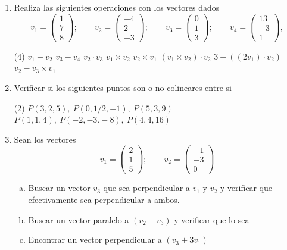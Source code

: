 \documentclass[12pt]{article}
\newenvironment{preguntas}
{\begin{enumerate}\itemsep12pt
	}
	{
	\end{enumerate}
}
\begin{document}
\begin{preguntas}
\item Realiza las siguientes operaciones con los vectores dados
	$$
	v_1 = \begin{pmatrix}
	1\\
	7\\
	8
\end{pmatrix};\qquad
	v_2 = \begin{pmatrix}
	-4\\
	2\\
	-3
\end{pmatrix}; \qquad
	v_3 = \begin{pmatrix}
	0\\
	1\\
	3
\end{pmatrix}; \qquad
	v_4 = \begin{pmatrix}
	13\\
	-3\\
	1
\end{pmatrix},
	 $$
\begin{tasks}(4)
\task $v_1 + v_2$
\task $v_3 - v_4$
\task $v_2 \cdot v_3$
\task $v_1 \times v_2$
\task $v_2 \times v_1$
\task $(v_1 \times v_2) \cdot v_2$
\task $3 - ((2v_1) \cdot v_2)$
\task $v_2 - v_3 \times v_1$
\end{tasks}
\item Verificar si los siguientes puntos son o no colineares entre si
\begin{tasks}(2)
\task $P(3,2,5), \ P(0, 1/2, -1), \ P(5, 3, 9)$
\task $P(1,1,4), \ P(-2,-3.-8), \ P(4,4,16)$
\end{tasks}
\item Sean los vectores
		$$
	v_1 = \begin{pmatrix}
	2\\
	1\\
	5
\end{pmatrix};\qquad
	v_2 = \begin{pmatrix}
	-1\\
	-3\\
	0
\end{pmatrix}$$
\begin{enumerate}[a)]
\item Buscar un vector $v_3$ que sea perpendicular a $v_1$ y $v_2$ y verificar que efectivamente sea perpendicular a ambos.
\item Buscar un vector paralelo a $(v_2-v_3)$ y verificar que lo sea
\item Encontrar un vector perpendicular a $(v_3 + 3v_1)$
\end{enumerate}

\end{preguntas}
\end{document}
